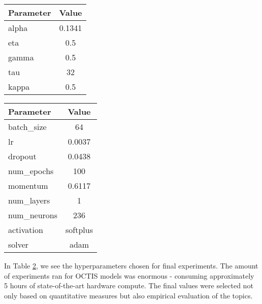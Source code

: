 \begin{table}[H]
    \begin{minipage}{.5\linewidth}
        \centering
        \begin{tabular}{lc}
            \toprule
            Parameter & Value \\
            \midrule
            alpha & 0.1341 \\
            eta & 0.5 \\
            gamma & 0.5 \\
            tau & 32 \\
            kappa & 0.5 \\
            \bottomrule
        \end{tabular}
    \end{minipage}%
    \begin{minipage}{.5\linewidth}
        \centering
        \begin{tabular}{lc}
            \toprule
            Parameter & Value \\
            \midrule
            batch\_size & 64 \\
            lr & 0.0037 \\
            dropout & 0.0438 \\
            num\_epochs & 100 \\
            momentum & 0.6117 \\
            num\_layers & 1 \\
            num\_neurons & 236 \\
            activation & softplus \\
            solver & adam \\
            \bottomrule
        \end{tabular}
    \end{minipage}
\label{tab:octisHyperparam}
\end{table}

In Table \ref{tab:octisHyperparam}, we see the hyperparameters chosen for final experiments. The amount of experiments ran for OCTIS models was enormous - consuming approximately 5 hours of state-of-the-art hardware compute. The final values were selected not only based on quantitative measures but also empirical evaluation of the topics. 

